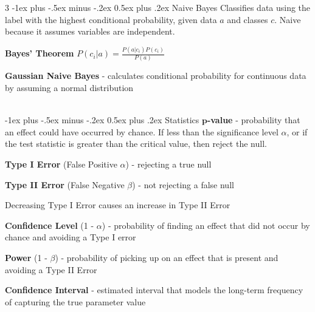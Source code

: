 \documentclass[10pt,landscape]{article}
\makeatletter
\renewcommand{\section}{\@startsection{section}{1}{0mm}%
                                {-1ex plus -.5ex minus -.2ex}%
                                {0.5ex plus .2ex}%
                                {\normalfont\large\bfseries}}
\makeatother
\begin{document}
\begin{multicols}{3}
\section{Naive Bayes}
Classifies data using the label with the highest conditional probability, given data $a$ and classes $c$. Naive because it assumes variables are independent.

\textbf{Bayes' Theorem} $ P({c_i}|{a})  = \frac{P({a}|{c_i})P({c_i})}{P({a})}$

\textbf{Gaussian Naive Bayes} - calculates conditional probability for continuous data by assuming a normal distribution

\columnbreak
\textcolor{white}{.}\vspace{-5mm}\\ %
\section{Statistics}
$\boldsymbol p$\textbf{-value} - probability that an effect could have occurred by chance. If less than the significance level $\alpha$, or if the test statistic is greater than the critical value, then reject the null.

\textbf{Type I Error} (False Positive $\alpha$) - rejecting a true null

\textbf{Type II  Error} (False Negative $\beta$)  - not rejecting a false null

Decreasing Type I Error causes an increase in Type II Error

\textbf{Confidence Level} (1 - $\alpha$) - probability of finding an effect that did not occur by chance and avoiding a Type I error

\textbf{Power} (1 - $\beta$) - probability of picking up on an effect that is present and avoiding a Type II Error

\textbf{Confidence Interval} - estimated interval that models the long-term frequency of capturing the true parameter value


\end{multicols}
\end{document}
